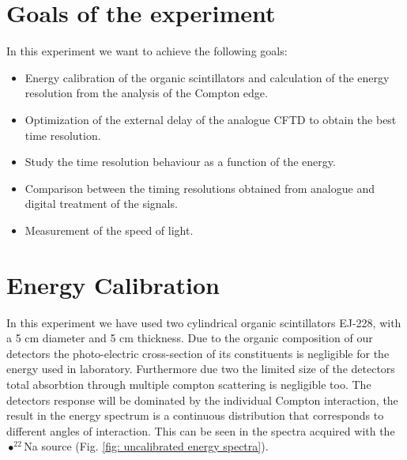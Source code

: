 \documentclass[a4paper,11pt]{article}
\begin{document}

\section*{Goals of the experiment}
In this experiment we want to achieve the following goals:

\begin{itemize}
\item Energy calibration of the organic scintillators and
calculation of the energy resolution from the analysis of
the Compton edge.
\item Optimization of the external delay of the analogue
CFTD to obtain the best time resolution.
\item Study the time resolution behaviour as a function of the
energy.
\item Comparison between the timing resolutions obtained
from analogue and digital treatment of the signals.
\item Measurement of the speed of light. 
\end{itemize}

\section*{Energy Calibration}

In this experiment we have used  two cylindrical organic scintillators EJ-228, with a 5 cm diameter and 5 cm thickness. 
Due to the organic composition of our detectors the photo-electric cross-section of its constituents is negligible for the energy used in laboratory. Furthermore due two the limited size of the detectors total absorbtion through multiple compton scattering is negligible too. The detectors response will be dominated by the individual Compton interaction, the result in the energy spectrum is a continuous distribution that corresponds to different angles of interaction. This can be seen in the spectra acquired with the $•^{22}$Na source (Fig. \ref{fig: uncalibrated energy spectra}).
\end{document}
